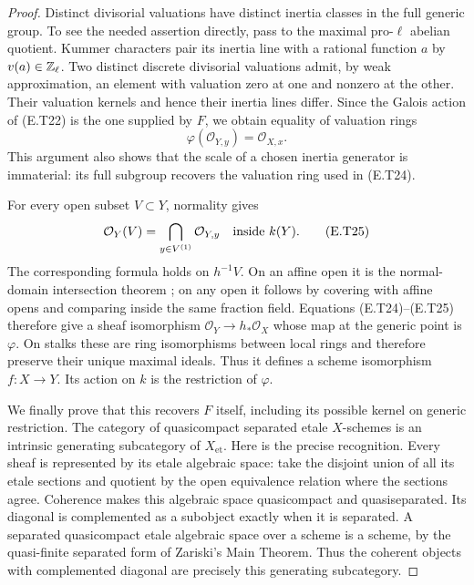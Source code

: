 \begin{proof}
Distinct divisorial valuations have distinct inertia classes
in the full generic group.  To see the needed assertion
directly, pass to the maximal pro-$\ell$ abelian quotient.
Kummer characters pair its inertia line with a rational
function $a$ by $v(a)\in\mathbb Z_\ell$.  Two distinct discrete
divisorial valuations admit, by weak approximation, an
element with valuation zero at one and nonzero at the other.
Their valuation kernels and hence their inertia lines differ.
Since the Galois action of (E.T22) is the one supplied by $F$,
we obtain equality of valuation rings
\[
                 \varphi(\mathcal O_{Y,y})=\mathcal O_{X,x}.
                                                               \tag{E.T24}
\]
This argument also shows that the scale of a chosen inertia
generator is immaterial: its full subgroup recovers the
valuation ring used in (E.T24).

For every open subset $V\subset Y$, normality gives
\[
 \mathcal O_Y(V)=\bigcap_{y\in V^{(1)}}\mathcal O_{Y,y}
                    \quad\hbox{inside }k(Y).                \tag{E.T25}
\]
The corresponding formula holds on $h^{-1}V$.  On an affine
open it is the normal-domain intersection theorem
\cite[Lemma 10.157.6]{StacksNormalIntersection}; on any open
it follows by covering with affine opens and comparing
inside the same fraction field.  Equations (E.T24)--(E.T25)
therefore give a sheaf isomorphism
$\mathcal O_Y\to h_*\mathcal O_X$ whose map at the generic
point is $\varphi$.  On stalks these are ring isomorphisms
between local rings and therefore preserve their unique
maximal ideals.  Thus it defines a scheme isomorphism $f:X\to Y$.
Its action on $k$ is the restriction of $\varphi$.

We finally prove that this recovers $F$ itself, including its
possible kernel on generic restriction.  The category of
quasicompact separated etale $X$-schemes is an intrinsic
generating subcategory of $X_{\mathrm{et}}$.  Here is the
precise recognition.  Every sheaf is represented by its
etale algebraic space: take the disjoint union of all its
etale sections and quotient by the open equivalence relation
where the sections agree.  Coherence makes this algebraic
space quasicompact and quasiseparated.  Its diagonal is
complemented as a subobject exactly when it is separated.
A separated quasicompact etale algebraic space over a scheme
is a scheme, by the quasi-finite separated form of Zariski's
Main Theorem.  Thus the coherent objects with complemented
diagonal are precisely this generating subcategory.


\end{proof}
